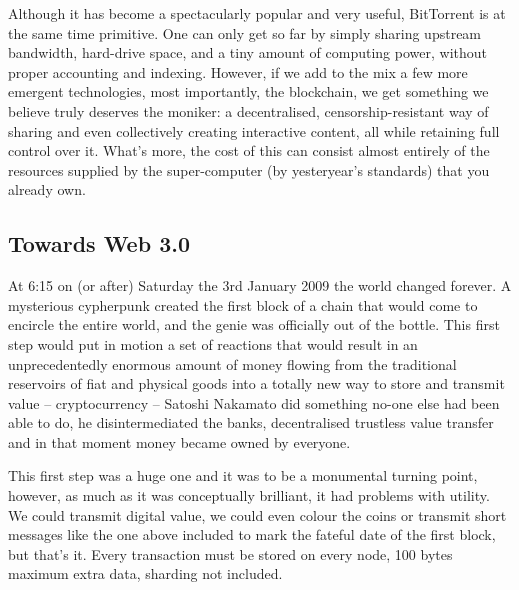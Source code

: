 Although it has become a spectacularly popular and very useful, BitTorrent is at the same time primitive. One can only get so far by simply sharing upstream bandwidth, hard-drive space, and a tiny amount of computing power, without proper accounting and indexing. However, if we add to the mix a few more emergent technologies, most importantly, the blockchain, we get something we believe truly deserves the  moniker: a decentralised, censorship-resistant way of sharing and even collectively creating interactive content, all while retaining full control over it. What's more, the cost of this can consist almost entirely of the resources supplied by the super-computer (by yesteryear's standards) that you already own.

\subsection{Towards Web 3.0 \statusgreen}\label{sec:towards-web3}



At 6:15 on (or after) Saturday the 3rd January 2009 the world changed forever. A mysterious cypherpunk created the first block of a chain that would come to encircle the entire world, and the genie was officially out of the bottle. This first step would put in motion a set of reactions that would result in an unprecedentedly enormous amount of money flowing from the traditional reservoirs of fiat and physical goods into a totally new way to store and transmit value -- cryptocurrency -- Satoshi Nakamato did something no-one else had been able to do, he disintermediated the banks, decentralised trustless value transfer and in that moment money became owned by everyone.

This first step was a huge one and it was to be a monumental turning point, however, as much as it was conceptually brilliant, it had problems with utility. We could transmit digital value, we could even colour the coins or transmit short messages like the one above included to mark the fateful date of the first block, but that's it. Every transaction must be stored on every node, 100 bytes maximum extra data, sharding not included.

